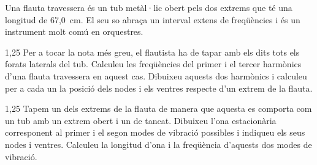 Una flauta travessera és un tub metàl·lic obert pels dos extrems que té una longitud de 67,0~cm. El seu so abraça un interval extens de freqüències i és un instrument molt comú en orquestres.

\begin{apartat}{1,25}
Per a tocar la nota més greu, el flautista ha de tapar amb els dits tots els forats laterals del tub. Calculeu les freqüències del primer i el tercer harmònics d'una flauta travessera en aquest cas. Dibuixeu aquests dos harmònics i calculeu per a cada un la posició dels nodes i els ventres respecte d'un extrem de la flauta.
\end{apartat}

\begin{apartat}{1,25}
Tapem un dels extrems de la flauta de manera que aquesta es comporta com un tub amb un extrem obert i un de tancat. Dibuixeu l'ona estacionària corresponent al primer i el segon modes de vibració possibles i indiqueu els seus nodes i ventres. Calculeu la longitud d'ona i la freqüència d'aquests dos modes de vibració.
\end{apartat}

